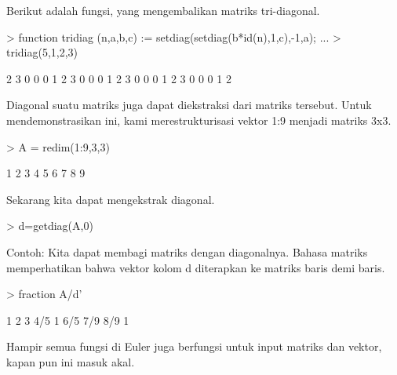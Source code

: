 \documentclass[a4paper,10pt]{article}
\begin{document}
\begin{eulernotebook}
\begin{eulercomment}
\begin{eulercomment}
\begin{eulercomment}
\begin{eulercomment}
\begin{eulercomment}
\begin{eulercomment}
\begin{eulercomment}
Berikut adalah fungsi, yang mengembalikan matriks tri-diagonal.
\end{eulercomment}
\begin{eulerprompt}
> function tridiag (n,a,b,c) := setdiag(setdiag(b*id(n),1,c),-1,a); ...
> tridiag(5,1,2,3)
\end{eulerprompt}
\begin{euleroutput}
              2             3             0             0             0 
              1             2             3             0             0 
              0             1             2             3             0 
              0             0             1             2             3 
              0             0             0             1             2 
\end{euleroutput}
\begin{eulercomment}
Diagonal suatu matriks juga dapat diekstraksi dari matriks tersebut.
Untuk mendemonstrasikan ini, kami merestrukturisasi vektor 1:9 menjadi
matriks 3x3.
\end{eulercomment}
\begin{eulerprompt}
> A = redim(1:9,3,3)
\end{eulerprompt}
\begin{euleroutput}
              1             2             3 
              4             5             6 
              7             8             9 
\end{euleroutput}
\begin{eulercomment}
Sekarang kita dapat mengekstrak diagonal.
\end{eulercomment}
\begin{eulerprompt}
> d=getdiag(A,0)
\end{eulerprompt}
\begin{euleroutput}
  [1,  5,  9]
\end{euleroutput}
\begin{eulercomment}
Contoh: Kita dapat membagi matriks dengan diagonalnya. Bahasa matriks
memperhatikan bahwa vektor kolom d diterapkan ke matriks baris demi
baris.
\end{eulercomment}
\begin{eulerprompt}
> fraction A/d'
\end{eulerprompt}
\begin{euleroutput}
          1         2         3 
        4/5         1       6/5 
        7/9       8/9         1 
\end{euleroutput}
\begin{eulercomment}
Hampir semua fungsi di Euler juga berfungsi untuk input matriks dan
vektor, kapan pun ini masuk akal.


\end{eulercomment}
\end{eulercomment}
\end{eulercomment}
\end{eulercomment}
\end{eulercomment}
\end{eulercomment}
\end{eulercomment}
\end{eulernotebook}
\end{document}
